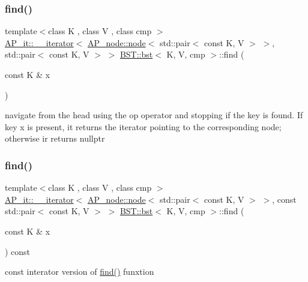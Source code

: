 \subsubsection{\texorpdfstring{find()}{find()}\hspace{0.1cm}{\footnotesize\ttfamily [1/2]}}
{\footnotesize\ttfamily template$<$class K , class V , class cmp $>$ \\
\hyperlink{classAP__it_1_1____iterator}{A\+P\+\_\+it\+::\+\_\+\+\_\+iterator}$<$ \hyperlink{structAP__node_1_1node}{A\+P\+\_\+node\+::node}$<$ std\+::pair$<$ const K, V $>$ $>$, std\+::pair$<$ const K, V $>$ $>$ \hyperlink{classBST_1_1bst}{B\+S\+T\+::bst}$<$ K, V, cmp $>$\+::find (\begin{DoxyParamCaption}\item[{const K \&}]{x }\end{DoxyParamCaption})}

navigate from the head using the op operator and stopping if the key is found. If key x is present, it returns the iterator pointing to the corresponding node; otherwise ir returns nullptr \mbox{\label{classBST_1_1bst_a5c0e2b56c838441ec33d29c0184b941b}} 
\subsubsection{\texorpdfstring{find()}{find()}\hspace{0.1cm}{\footnotesize\ttfamily [2/2]}}
{\footnotesize\ttfamily template$<$class K , class V , class cmp $>$ \\
\hyperlink{classAP__it_1_1____iterator}{A\+P\+\_\+it\+::\+\_\+\+\_\+iterator}$<$ \hyperlink{structAP__node_1_1node}{A\+P\+\_\+node\+::node}$<$ std\+::pair$<$ const K, V $>$ $>$, const std\+::pair$<$ const K, V $>$ $>$ \hyperlink{classBST_1_1bst}{B\+S\+T\+::bst}$<$ K, V, cmp $>$\+::find (\begin{DoxyParamCaption}\item[{const K \&}]{x }\end{DoxyParamCaption}) const}

const interator version of \hyperlink{classBST_1_1bst_a35880bb25ce5fbe2a10ce004b33cd5f2}{find()} funxtion \mbox{\label{classBST_1_1bst_a415605474ad54b651f34d73c448fdba3}} 
